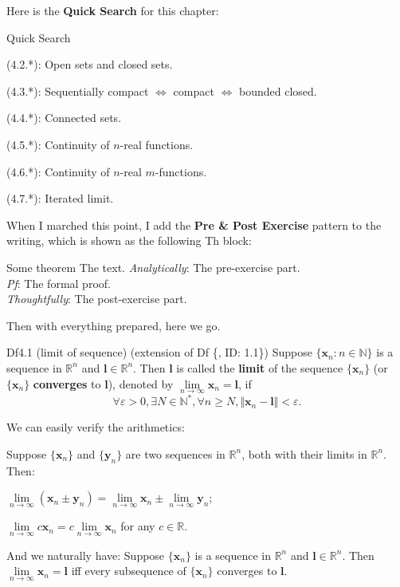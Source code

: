 \documentclass{article}
\begin{document}
Here is the \textbf{Quick Search} for this chapter:
\begin{Th}{Quick Search}
    \begin{compactdesc}
        \item (4.2.*): Open sets and closed sets.
        \item (4.3.*): Sequentially compact $\Leftrightarrow$ compact $\Leftrightarrow$ bounded closed.
        \item (4.4.*): Connected sets.
        \item (4.5.*): Continuity of $n$-real functions.
        \item (4.6.*): Continuity of $n$-real $m$-functions.
        \item (4.7.*): Iterated limit.
    \end{compactdesc}
\end{Th}

When I marched this point, I add the \textbf{Pre \& Post Exercise} pattern to the writing, which is shown as the following Th block:

\begin{Th}{Some theorem}
    The text.
    \tcblower
    \textcolor{P}{\textit{Analytically}: The pre-exercise part.}\\
    \textit{Pf}: The formal proof.\\
    \textcolor{P}{\textit{Thoughtfully}: The post-exercise part.}
\end{Th}

Then with everything prepared, here we go.

\begin{Df}{Df4.1 (limit of sequence) (extension of Df \{, ID: 1.1\})}
    Suppose $\{\pmb{x}_n: n\in\mathbb{N}\}$ is a sequence in $\mathbb{R}^n$ and $\pmb{l}\in\mathbb{R}^n$. Then $\pmb{l}$ is called the \textbf{limit} of the sequence $\{\pmb{x}_n\}$ (or $\{\pmb{x}_n\}$ \textbf{converges} to $\pmb{l}$), denoted by $\lim\limits_{n\to\infty} \pmb{x}_n = \pmb{l}$, if
    $$\forall \varepsilon > 0, \exists N\in\mathbb{N}^\ast, \forall n\geq N, \Vert \pmb{x}_n - \pmb{l}\Vert < \varepsilon.$$
\end{Df}

\begin{Rmk}{}
    We can easily verify the arithmetics:
    \textcolor{Th}{Suppose $\{\pmb{x}_n\}$ and $\{\pmb{y}_n\}$ are two sequences in $\mathbb{R}^n$, both with their limits in $\mathbb{R}^n$. Then:
    \begin{compactenum}
        \item $\lim\limits_{n\to\infty} (\pmb{x}_n\pm\pmb{y}_n) = \lim\limits_{n\to\infty} \pmb{x}_n \pm \lim\limits_{n\to\infty} \pmb{y}_n$;
        \item $\lim\limits_{n\to\infty} c\pmb{x}_n = c\lim\limits_{n\to\infty} \pmb{x}_n$ for any $c\in\mathbb{R}$.
    \end{compactenum}}
    And we naturally have:
    \textcolor{Th}{Suppose $\{\pmb{x}_n\}$ is a sequence in $\mathbb{R}^n$ and $\pmb{l}\in\mathbb{R}^n$. Then $\lim\limits_{n\to\infty} \pmb{x}_n = \pmb{l}$ iff every subsequence of $\{\pmb{x}_n\}$ converges to $\pmb{l}$.}
\end{Rmk}
\end{document}
